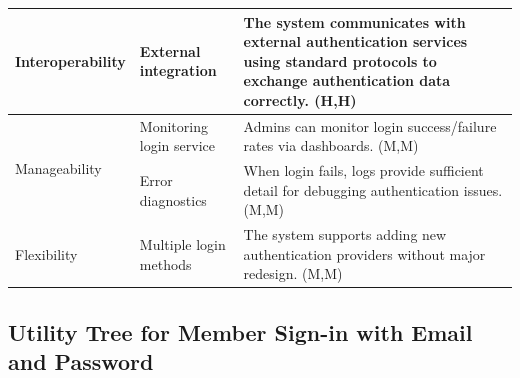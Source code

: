 \documentclass{article}
\begin{document}
\begin{table}[H]
\begin{tabular}{|p{3cm}|p{4cm}|p{7cm}|}
Interoperability
& External integration
& The system communicates with external authentication services using standard protocols to exchange authentication data correctly. (H,H) \\
\hline

\multirow{2}{*}{Manageability}
& Monitoring login service
& Admins can monitor login success/failure rates via dashboards. (M,M) \\
\cline{2-3}
& Error diagnostics
& When login fails, logs provide sufficient detail for debugging authentication issues. (M,M) \\
\hline

Flexibility
& Multiple login methods
& The system supports adding new authentication providers without major redesign. (M,M) \\
\hline

\end{tabular}
\end{table}

\subsection{Utility Tree for Member Sign-in with Email and Password}
\end{document}
